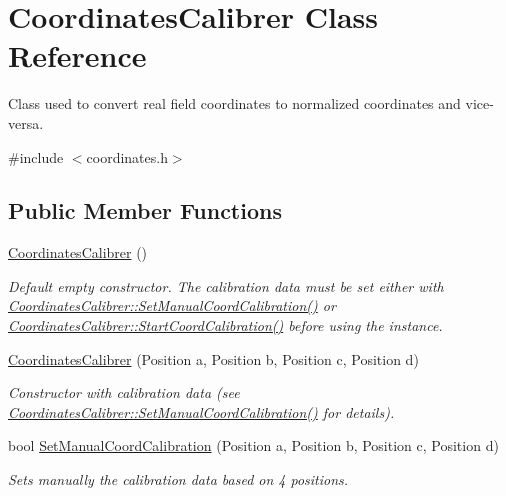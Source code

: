 \hypertarget{classCoordinatesCalibrer}{
\section{CoordinatesCalibrer Class Reference}
\label{classCoordinatesCalibrer}
}


Class used to convert real field coordinates to normalized coordinates and vice-\/versa.  




{\ttfamily \#include $<$coordinates.h$>$}

\subsection*{Public Member Functions}
\begin{DoxyCompactItemize}
\item 
\hyperlink{classCoordinatesCalibrer_ac9a522299ada8f2e58ed8f0c91f4f396}{CoordinatesCalibrer} ()
\begin{DoxyCompactList}\small\item\em Default empty constructor. The calibration data must be set either with \hyperlink{classCoordinatesCalibrer_a006c18905b14e4780b9fc74fe26649fc}{CoordinatesCalibrer::SetManualCoordCalibration()} or \hyperlink{classCoordinatesCalibrer_a2087994adbb8651efcb06e3d7a2315da}{CoordinatesCalibrer::StartCoordCalibration()} before using the instance. \item\end{DoxyCompactList}\item 
\hyperlink{classCoordinatesCalibrer_a3b6304945fa64ac97a1b0bbc78753155}{CoordinatesCalibrer} (Position a, Position b, Position c, Position d)
\begin{DoxyCompactList}\small\item\em Constructor with calibration data (see \hyperlink{classCoordinatesCalibrer_a006c18905b14e4780b9fc74fe26649fc}{CoordinatesCalibrer::SetManualCoordCalibration()} for details). \item\end{DoxyCompactList}\item 
bool \hyperlink{classCoordinatesCalibrer_a006c18905b14e4780b9fc74fe26649fc}{SetManualCoordCalibration} (Position a, Position b, Position c, Position d)
\begin{DoxyCompactList}\small\item\em Sets manually the calibration data based on 4 positions. \item\end{DoxyCompactList}\item 

\end{DoxyCompactItemize}
